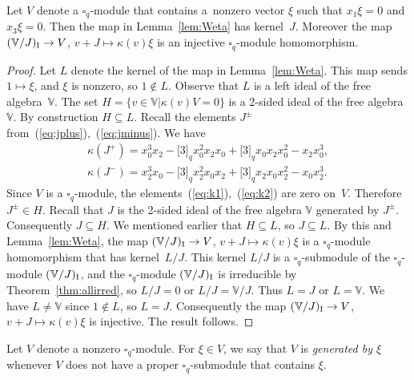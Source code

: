 \begin{Lemma}\label{lem:qSerreW} Let $V$ denote a $\square_q$-module that contains a~nonzero vector $\xi$ such that $x_1 \xi = 0 $ and $x_3 \xi = 0$. Then the map in Lemma~{\rm \ref{lem:Weta}} has kernel~$J$.
Moreover the map $(\mathbb V/J)_{\rm I} \to V$, $v+J \mapsto \kappa(v)\xi$ is an injective $\square_q$-module homomorphism.
\end{Lemma}
\begin{proof}Let $L$ denote the kernel of the map in Lemma~\ref{lem:Weta}. This map sends $1 \mapsto \xi$, and $\xi$ is nonzero, so $1 \not \in L$. Observe that $L$ is a left ideal of the free algebra~$\mathbb V$.
The set $H= \lbrace v \in \mathbb V| \kappa(v)V=0\rbrace$ is a 2-sided ideal of the free algebra~$\mathbb V$. By construction $H \subseteq L$. Recall the elements $J^{\pm}$ from~(\ref{eq:jplus}),~(\ref{eq:jminus}). We have
\begin{gather}
\kappa(J^+) =x^3_0 x_{2} - \lbrack 3 \rbrack_q x^2_0 x_{2} x_0 +\lbrack 3 \rbrack_q x_0 x_{2} x^2_0 -x_{2} x^3_0,\label{eq:k1}\\
\kappa(J^-)=x^3_2 x_{0} - \lbrack 3 \rbrack_q x^2_2 x_{0} x_2 +\lbrack 3 \rbrack_q x_2 x_{0} x^2_2 -x_{0} x^3_2.\label{eq:k2}
\end{gather}
Since $V$ is a $\square_q$-module, the elements~(\ref{eq:k1}),~(\ref{eq:k2}) are zero on~$V$. Therefore
$J^\pm \in H$. Recall that $J$ is the 2-sided ideal of the free algebra $\mathbb V$ generated by $J^{\pm}$. Consequently $J \subseteq H$. We mentioned earlier that $H \subseteq L$, so $J \subseteq L$.
By this and Lemma~\ref{lem:Weta}, the map $(\mathbb V/J)_{\rm I} \to V$, $v+J \mapsto \kappa(v)\xi$
is a $\square_q$-module homomorphism that has kernel~$L/J$. This kernel $L/J$ is a $\square_q$-submodule of the $\square_q$-module $(\mathbb V/J)_{\rm I}$, and the $\square_q$-module $(\mathbb V/J)_{\rm I}$ is irreducible by Theorem~\ref{thm:allirred}, so $L/J=0$ or $L/J=\mathbb V/J$. Thus $L=J$ or $L=\mathbb V$.
We have $L\not=\mathbb V$ since $1 \not\in L$, so $L=J$. Consequently the map $(\mathbb V/J)_{\rm I} \to V$, $v+J \mapsto \kappa(v)\xi$ is injective. The result follows.
\end{proof}

Let $V$ denote a nonzero $\square_q$-module. For $\xi\in V$, we say that $V$ is {\it generated by $\xi$} whenever $V$ does not have a proper $\square_q$-submodule that contains $\xi$.

